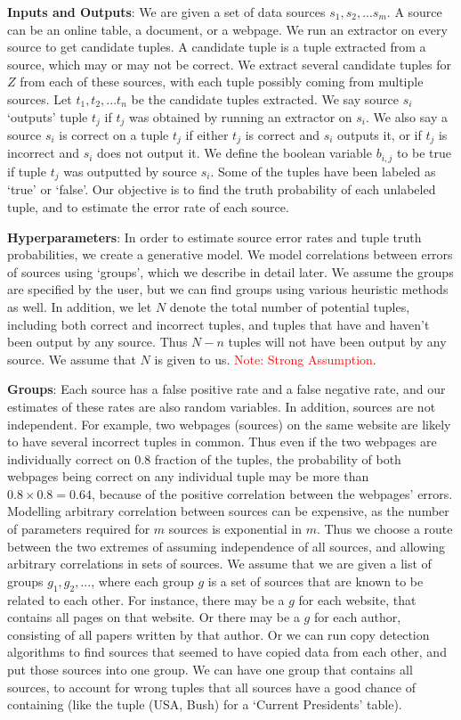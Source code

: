 \documentclass{sig-alternate}
\newcounter{prob}
\newcommand{\mrj}[1]{\textcolor{red}{#1}}
\newcommand{\stitle}[1]{\vspace{0.5em}\noindent\textbf{#1}}
\begin{document}
\stitle{Inputs and Outputs}: We are given a set of data sources $s_1, s_2, ... s_m$. A source can be an online table, a document, or a webpage. We run an extractor on every source to get candidate tuples. A candidate tuple is a tuple extracted from a source, which may or may not be correct. We extract several candidate tuples for $Z$ from each of these sources, with each tuple possibly coming from multiple sources. Let $t_1, t_2, ... t_n$ be the candidate tuples extracted. We say source $s_i$ `outputs' tuple $t_j$ if $t_j$ was obtained by running an extractor on $s_i$. We also say a source $s_i$ is correct on a tuple $t_j$ if either $t_j$ is correct and $s_i$ outputs it, or if $t_j$ is incorrect and $s_i$ does not output it. We define the boolean variable $b_{i,j}$ to be true if tuple $t_j$ was outputted by source $s_i$. Some of the tuples have been labeled as `true' or `false'. Our objective is to find the truth probability of each unlabeled tuple, and to estimate the error rate of each source.

\stitle{Hyperparameters}: In order to estimate source error rates and tuple truth probabilities, we create a generative model. We model correlations between errors of sources using `groups', which we describe in detail later. We assume the groups are specified by the user, but we can find groups using various heuristic methods as well. In addition, we let $N$ denote the total number of potential tuples, including both correct and incorrect tuples, and tuples that have and haven't been output by any source. Thus $N-n$ tuples will not have been output by any source. We assume that $N$ is given to us. \mrj{Note: Strong Assumption}. 

\stitle{Groups}: Each source has a false positive rate and a false negative rate, and our estimates of these rates are also random variables. In addition, sources are not independent. For example, two webpages (sources) on the same website are likely to have several incorrect tuples in common. Thus even if the two webpages are individually correct on $0.8$ fraction of the tuples, the probability of both webpages being correct on any individual tuple may be more than $0.8 \times 0.8 = 0.64$, because of the positive correlation between the webpages' errors. Modelling arbitrary correlation between sources can be expensive, as the number of parameters required for $m$ sources is exponential in $m$. Thus we choose a route between the two extremes of assuming independence of all sources, and allowing arbitrary correlations in sets of sources. We assume that we are given a list of groups $g_1, g_2, ...$, where each group $g$ is a set of sources that are known to be related to each other. For instance, there may be a $g$ for each website, that contains all pages on that website. Or there may be a $g$ for each author, consisting of all papers written by that author. Or we can run copy detection algorithms to find sources that seemed to have copied data from each other, and put those sources into one group. We can have one group that contains all sources, to account for wrong tuples that all sources have a good chance of containing (like the tuple (USA, Bush) for a `Current Presidents' table).
\end{document}

